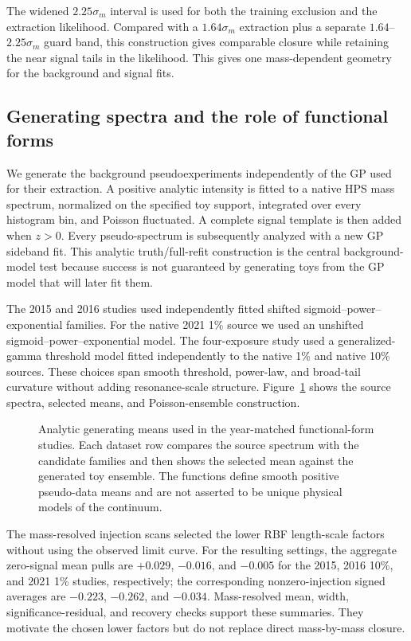 The widened $2.25\sigma_m$ interval is used for both the training exclusion
and the extraction likelihood.  Compared with a $1.64\sigma_m$ extraction plus a
separate $1.64$--$2.25\sigma_m$ guard band, this construction gives comparable
closure while retaining the near signal tails in the likelihood. This gives one
mass-dependent geometry for the background and signal fits.

\subsection{Generating spectra and the role of functional forms}

We generate the background pseudoexperiments independently of the GP used for their
extraction. A positive analytic intensity is fitted to a native HPS mass spectrum,
normalized on the specified toy support, integrated over every histogram bin, and
Poisson fluctuated.  A complete signal template is then added when $z>0$.  Every
pseudo-spectrum is subsequently analyzed with a new GP sideband fit.  This analytic
truth/full-refit construction is the central background-model test because success is
not guaranteed by generating toys from the GP model that will later fit them.

The 2015 and 2016 studies used independently fitted shifted
sigmoid--power--exponential families. For the native 2021 1\% source we used an
unshifted sigmoid--power--exponential model. The four-exposure study used a
generalized-gamma threshold model fitted independently to the native 1\% and native
10\% sources. These choices span smooth threshold, power-law, and broad-tail
curvature without adding resonance-scale structure.  Figure~\ref{fig:v491-functional-form-seed-overview}
shows the source spectra, selected means, and Poisson-ensemble construction.

\begin{figure}[p]
\centering
{}
\caption{Analytic generating means used in the year-matched functional-form studies.
Each dataset row compares the source spectrum with the candidate families and then
shows the selected mean against the generated toy ensemble.  The functions define
smooth positive pseudo-data means and are not asserted to be unique physical models
of the continuum.}
\label{fig:v491-functional-form-seed-overview}
\end{figure}

The mass-resolved injection scans selected the lower RBF length-scale factors without
using the observed limit curve. For the resulting settings, the aggregate zero-signal
mean pulls are $+0.029$, $-0.016$, and $-0.005$ for the 2015, 2016 10\%, and 2021
1\% studies, respectively; the corresponding nonzero-injection signed averages are
$-0.223$, $-0.262$, and $-0.034$.  Mass-resolved mean, width,
significance-residual, and recovery checks support these summaries.  They motivate the
chosen lower factors but do not replace direct mass-by-mass
closure.

